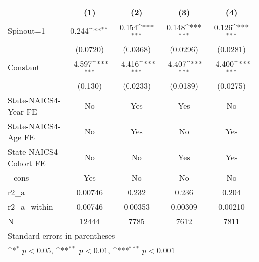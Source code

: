 {
\def\sym#1{\ifmmode^{#1}\else\(^{#1}\)\fi}
\begin{tabular}{l*{4}{c}}
\hline\hline
                    &\multicolumn{1}{c}{(1)}         &\multicolumn{1}{c}{(2)}         &\multicolumn{1}{c}{(3)}         &\multicolumn{1}{c}{(4)}         \\
\hline
Spinout=1           &       0.244\sym{**} &       0.154\sym{***}&       0.148\sym{***}&       0.126\sym{***}\\
                    &    (0.0720)         &    (0.0368)         &    (0.0296)         &    (0.0281)         \\
[1em]
Constant            &      -4.597\sym{***}&      -4.416\sym{***}&      -4.407\sym{***}&      -4.400\sym{***}\\
                    &     (0.130)         &    (0.0233)         &    (0.0189)         &    (0.0275)         \\
[1em]
State-NAICS4-Year FE&          No         &         Yes         &         Yes         &          No         \\
[1em]
State-NAICS4-Age FE &          No         &         Yes         &          No         &         Yes         \\
[1em]
State-NAICS4-Cohort FE&          No         &          No         &         Yes         &         Yes         \\
[1em]
\_cons              &         Yes         &          No         &          No         &          No         \\
\hline
r2\_a                &     0.00746         &       0.232         &       0.236         &       0.204         \\
r2\_a\_within         &     0.00746         &     0.00353         &     0.00309         &     0.00210         \\
N                   &       12444         &        7785         &        7612         &        7811         \\
\hline\hline
\multicolumn{5}{l}{\footnotesize Standard errors in parentheses}\\
\multicolumn{5}{l}{\footnotesize \sym{*} \(p<0.05\), \sym{**} \(p<0.01\), \sym{***} \(p<0.001\)}\\
\end{tabular}
}
